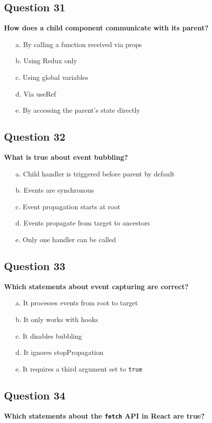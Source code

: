 \documentclass{article}
\begin{document}
\subsection*{Question 31}
\textbf{How does a child component communicate with its parent?}

\begin{itemize}
  \item[a.] By calling a function received via props
  \item[b.] Using Redux only
  \item[c.] Using global variables
  \item[d.] Via useRef
  \item[e.] By accessing the parent's state directly
\end{itemize}

\subsection*{Question 32}
\textbf{What is true about event bubbling?}

\begin{itemize}
  \item[a.] Child handler is triggered before parent by default
  \item[b.] Events are synchronous
  \item[c.] Event propagation starts at root
  \item[d.] Events propagate from target to ancestors
  \item[e.] Only one handler can be called
\end{itemize}

\subsection*{Question 33}
\textbf{Which statements about event capturing are correct?}

\begin{itemize}
  \item[a.] It processes events from root to target
  \item[b.] It only works with hooks
  \item[c.] It disables bubbling
  \item[d.] It ignores stopPropagation
  \item[e.] It requires a third argument set to \texttt{true}
\end{itemize}

\subsection*{Question 34}
\textbf{Which statements about the \texttt{fetch} API in React are true?}
\end{document}
